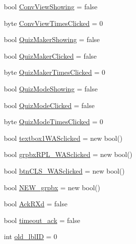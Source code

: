 \begin{DoxyCompactItemize}
\item 
bool \hyperlink{class_sr_p___classroom_inq_1_1frm_classrrom_inq_a5b2fbbaa361339e096aa4be3f8e2b2dd}{\-Conv\-View\-Showing} = false
\item 
byte \hyperlink{class_sr_p___classroom_inq_1_1frm_classrrom_inq_a8b7285b1ee1626d8ebdc99d4bd6046a8}{\-Conv\-View\-Times\-Clicked} = 0
\item 
bool \hyperlink{class_sr_p___classroom_inq_1_1frm_classrrom_inq_a527e6e32ab67073ccbdb94297399ab2d}{\-Quiz\-Maker\-Showing} = false
\item 
bool \hyperlink{class_sr_p___classroom_inq_1_1frm_classrrom_inq_a80b43512315939f073e08cfea00ce796}{\-Quiz\-Maker\-Clicked} = false
\item 
byte \hyperlink{class_sr_p___classroom_inq_1_1frm_classrrom_inq_ae28b52f195f8e33470bb7bbc988ba622}{\-Quiz\-Maker\-Times\-Clicked} = 0
\item 
bool \hyperlink{class_sr_p___classroom_inq_1_1frm_classrrom_inq_a2be9d2ea6cc1cabf0dc6c6f3ee2544ce}{\-Quiz\-Mode\-Showing} = false
\item 
bool \hyperlink{class_sr_p___classroom_inq_1_1frm_classrrom_inq_af09c14bf56f313348d1e4a533fe515bf}{\-Quiz\-Mode\-Clicked} = false
\item 
byte \hyperlink{class_sr_p___classroom_inq_1_1frm_classrrom_inq_a0c88b881dc5ae86b5b3d5e04434b2ea8}{\-Quiz\-Mode\-Times\-Clicked} = 0
\item 
bool \hyperlink{class_sr_p___classroom_inq_1_1frm_classrrom_inq_a998e499144884577e3445f4b721b4c6a}{textbox1\-W\-A\-Sclicked} = new bool()
\item 
bool \hyperlink{class_sr_p___classroom_inq_1_1frm_classrrom_inq_a97ab9f8512cd6b2f9648651d5c5d404b}{grpbx\-R\-P\-L\-\_\-\-W\-A\-Sclicked} = new bool()
\item 
bool \hyperlink{class_sr_p___classroom_inq_1_1frm_classrrom_inq_aed9d1ad7c4e2b196997c1820ac2cdb4d}{btn\-C\-L\-S\-\_\-\-W\-A\-Sclicked} = new bool()
\item 
bool \hyperlink{class_sr_p___classroom_inq_1_1frm_classrrom_inq_aaf5a152b29ae06c11e8e25f0eabf454d}{\-N\-E\-W\-\_\-grpbx} = new bool()
\item 
bool \hyperlink{class_sr_p___classroom_inq_1_1frm_classrrom_inq_a65b6633a5bc7bff8142fcace6bfba3f8}{\-Ack\-R\-Xd} = false
\item 
bool \hyperlink{class_sr_p___classroom_inq_1_1frm_classrrom_inq_a64cde7d8ac96b5122de783724c58103a}{timeout\-\_\-ack} = false
\item 
int \hyperlink{class_sr_p___classroom_inq_1_1frm_classrrom_inq_ac56e0f039ce0113331d9bdd322b30827}{old\-\_\-lbl\-I\-D} = 0

\end{DoxyCompactItemize}
